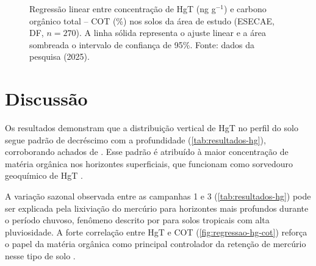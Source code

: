 \begin{figure}[H]
  \centering
  \fbox{\rule{0pt}{7cm}\rule{12cm}{0pt}}
  \caption{Regressão linear entre concentração de HgT (ng g$^{-1}$)
           e carbono orgânico total -- COT (\%) nos solos da área de
           estudo (ESECAE, DF, $n = 270$). A linha sólida representa
           o ajuste linear e a área sombreada o intervalo de confiança
           de 95\%. Fonte: dados da pesquisa (2025).}
  \label{fig:regressao-hg-cot}
\end{figure}

\section{Discussão}

Os resultados demonstram que a distribuição vertical de HgT no perfil
do solo segue padrão de decréscimo com a profundidade
(\autoref{tab:resultados-hg}), corroborando achados de
. Esse padrão é atribuído à maior
concentração de matéria orgânica nos horizontes superficiais, que
funcionam como sorvedouro geoquímico de HgT \cite{exemplo:livro:2020}.

A variação sazonal observada entre as campanhas 1 e 3
(\autoref{tab:resultados-hg}) pode ser explicada pela lixiviação
do mercúrio para horizontes mais profundos durante o período chuvoso,
fenômeno descrito por  para solos
tropicais com alta pluviosidade. A forte correlação entre HgT e COT
(\autoref{fig:regressao-hg-cot}) reforça o papel da matéria orgânica
como principal controlador da retenção de mercúrio nesse tipo de solo
\cite{exemplo:capitulo:2019}.
